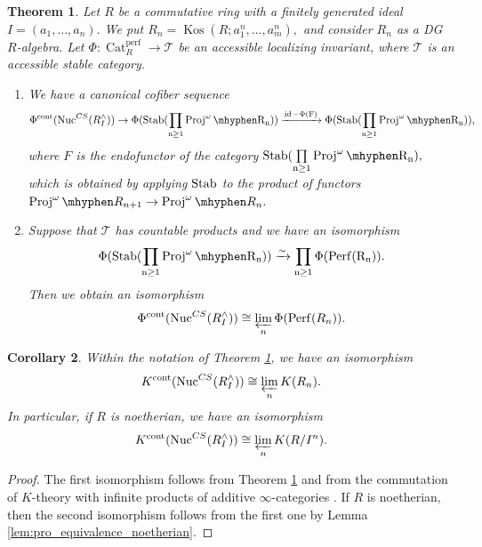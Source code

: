 \documentclass[11pt,leqno]{amsart}
\newtheorem{theo}{Theorem}[section]
\newtheorem{cor}[theo]{Corollary}
\numberwithin{equation}{section}
\newcommand{\hy}{\mhyphen}
\newcommand{\prolim}[1][]{\mathop{\varprojlim}\limits_{#1}}
\newcommand{\prodd}[1][]{\mathop{\prod}\limits_{#1}}
\newcommand{\xto}{\xrightarrow}
\newcommand{\Nuc}{\operatorname{Nuc}}
\newcommand{\Proj}{\operatorname{Proj}}
\newcommand{\Cat}{\operatorname{Cat}}
\newcommand{\cont}{\operatorname{cont}}
\newcommand{\cT}{{\mathcal T}}
\newcommand{\Perf}{\operatorname{Perf}}
\newcommand{\perf}{\operatorname{perf}}
\newcommand{\Kos}{\operatorname{Kos}}
\newcommand{\Stab}{\rm Stab}
\newcommand{\id}{\operatorname{id}}
\begin{document}
\begin{theo}\label{th:loc_invar_of_Nuc_CS}
Let $R$ be a commutative ring with a finitely generated ideal $I=(a_1,\dots,a_n).$ We put $R_n = \Kos(R;a_1^n,\dots,a_m^n),$ and consider $R_n$ as a DG $R$-algebra. Let $\Phi:\Cat_R^{\perf}\to\cT$ be an accessible localizing invariant, where $\cT$ is an accessible stable category.
\begin{enumerate}[label=(\roman*),ref=(\roman*)]
	\item We have a canonical cofiber sequence
	\begin{equation*}
		\Phi^{\cont}(\Nuc^{CS}(R^{\wedge}_I))\to \Phi(\Stab(\prodd[n\geq 1]\Proj^{\omega}\hy R_n))\xto{\id-\Phi(F)} \Phi(\Stab(\prodd[n\geq 1]\Proj^{\omega}\hy R_n)),
	\end{equation*}
	where $F$ is the endofunctor of the category $\Stab(\prodd[n\geq 1]\Proj^{\omega}\hy R_n),$ which is obtained by applying $\Stab$ to the product of functors $\Proj^{\omega}\hy R_{n+1}\to\Proj^{\omega}\hy R_n.$ \label{Phi^cont_of_Nuc^CS_via_exact_triangle}
\item Suppose that $\cT$ has countable products and we have an isomorphism 
\begin{equation*}
	\Phi(\Stab(\prodd[n\geq 1]\Proj^{\omega}\hy R_n))\xto{\sim} \prodd[n\geq 1]\Phi(\Perf(R_n)).
\end{equation*}
Then we obtain an isomorphism
\begin{equation*}
	\Phi^{\cont}(\Nuc^{CS}(R^{\wedge}_I))\cong \prolim[n]\Phi(\Perf(R_n)).
\end{equation*} \label{Phi^cont_of_Nuc^CS_as_a_limit}
\end{enumerate}
\end{theo}

\begin{cor}\label{cor:K_theory_of_Nuc^CS}
Within the notation of Theorem \ref{th:loc_invar_of_Nuc_CS}, we have an isomorphism
\begin{equation*}
K^{\cont}(\Nuc^{CS}(R^{\wedge}_I))\cong\prolim[n] K(R_n).
\end{equation*}
In particular, if $R$ is noetherian, we have an isomorphism
\begin{equation*}
K^{\cont}(\Nuc^{CS}(R^{\wedge}_I))\cong \prolim[n] K(R/I^n).
\end{equation*}
\end{cor}

\begin{proof}
The first isomorphism follows from Theorem \ref{th:loc_invar_of_Nuc_CS} and from the commutation of $K$-theory with infinite products of additive $\infty$-categories \cite[Proposition 2.11]{Cor}. If $R$ is noetherian, then the second isomorphism follows from the first one by Lemma \ref{lem:pro_equivalence_noetherian}.
\end{proof}
\end{document}
